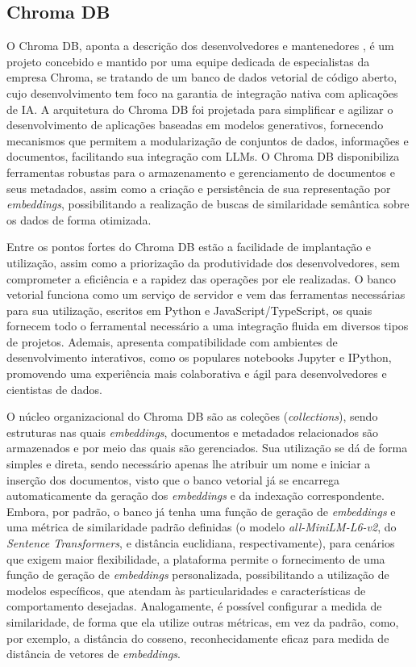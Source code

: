 \subsection{Chroma DB}
\label{subsec:Assistente.1.1}

O Chroma DB, aponta a descrição dos desenvolvedores e mantenedores \cite{Chroma:1}, é um projeto concebido e mantido por uma equipe dedicada de especialistas da empresa Chroma, se tratando de um banco de dados vetorial de código aberto, cujo desenvolvimento tem foco na garantia de integração nativa com aplicações de \ac{IA}. A arquitetura do Chroma DB foi projetada para simplificar e agilizar o desenvolvimento de aplicações baseadas em modelos generativos, fornecendo mecanismos que permitem a modularização de conjuntos de dados, informações e documentos, facilitando sua integração com \ac{LLM}s. O Chroma DB disponibiliza ferramentas robustas para o armazenamento e gerenciamento de documentos e seus metadados, assim como a criação e persistência de sua representação por \textit{embeddings}, possibilitando a realização de buscas de similaridade semântica sobre os dados de forma otimizada.

Entre os pontos fortes do Chroma DB estão a facilidade de implantação e utilização, assim como a priorização da produtividade dos desenvolvedores, sem comprometer a eficiência e a rapidez das operações por ele realizadas. O banco vetorial funciona como um serviço de servidor e vem das ferramentas necessárias para sua utilização, escritos em Python e JavaScript/TypeScript, os quais fornecem todo o ferramental necessário a uma integração fluida em diversos tipos de projetos. Ademais, apresenta compatibilidade com ambientes de desenvolvimento interativos, como os populares notebooks Jupyter e IPython, promovendo uma experiência mais colaborativa e ágil para desenvolvedores e cientistas de dados.

O núcleo organizacional do Chroma DB são as coleções (\textit{collections}), sendo estruturas nas quais \textit{embeddings}, documentos e metadados relacionados são armazenados e por meio das quais são gerenciados. Sua utilização se dá de forma simples e direta, sendo necessário apenas lhe atribuir um nome e iniciar a inserção dos documentos, visto que o banco vetorial já se encarrega automaticamente da geração dos \textit{embeddings} e da indexação correspondente. Embora, por padrão, o banco já tenha uma função de geração de \textit{embeddings} e uma métrica de similaridade padrão definidas (o modelo \textit{all-MiniLM-L6-v2}, do \textit{Sentence Transformers}, e distância euclidiana, respectivamente), para cenários que exigem maior flexibilidade, a plataforma permite o fornecimento de uma função de geração de \textit{embeddings} personalizada, possibilitando a utilização de modelos específicos, que atendam às particularidades e características de comportamento desejadas. Analogamente, é possível configurar a medida de similaridade, de forma que ela utilize outras métricas, em vez da padrão, como, por exemplo, a distância do cosseno, reconhecidamente eficaz para medida de distância de vetores de \textit{embeddings}.

